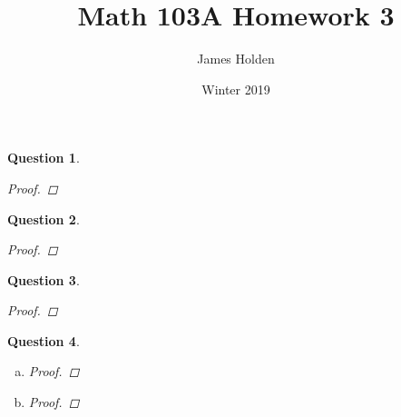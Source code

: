 \documentclass{article}
\title{Math 103A Homework 3}
\date{Winter 2019}
\author{James Holden}
\newtheorem{ques}{Question}
\begin{document}
\maketitle

\begin{ques}
		
	\begin{proof}
	\end{proof}
\end{ques}

\begin{ques}
	\begin{proof}
	\end{proof}
\end{ques}


\begin{ques}

	\begin{proof}
	\end{proof}
\end{ques}


\begin{ques}
\begin{enumerate}[(a)]
\item 
\begin{proof}

\end{proof}

\item 

\begin{proof}
\end{proof}

\end{enumerate}
\end{ques}
\end{document}
